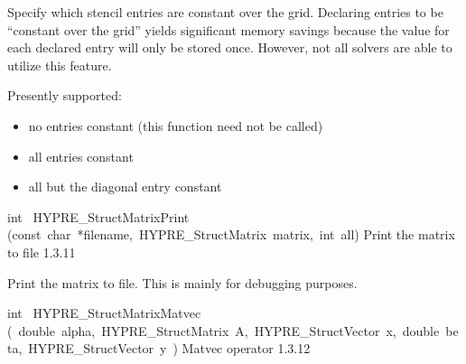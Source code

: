 \documentclass{article}
\begin{document}
\begin{cxxentry}
\begin{cxxentry}
\begin{cxxfunction}
\begin{cxxdoc}
Specify which stencil entries are constant over the grid.  Declaring entries
to be ``constant over the grid'' yields significant memory savings because
the value for each declared entry will only be stored once.  However, not all
solvers are able to utilize this feature.

Presently supported:
\begin{itemize}
\item no entries constant (this function need not be called)
\item all entries constant
\item all but the diagonal entry constant
\end{itemize}
\end{cxxdoc}
\end{cxxfunction}
\begin{cxxfunction}
{int\ }
        {HYPRE\_StructMatrixPrint}
        {(const\ char\ *filename,\ HYPRE\_StructMatrix\ matrix,\ int\ all)}
        {
Print the matrix to file}
        {1.3.11}
\begin{cxxdoc}

Print the matrix to file.  This is mainly for debugging purposes.
\end{cxxdoc}
\end{cxxfunction}
\begin{cxxfunction}
{int\ }
        {HYPRE\_StructMatrixMatvec}
        {(\ double\ alpha,\ HYPRE\_StructMatrix\ A,\ HYPRE\_StructVector\ x,\ double\ beta,\ HYPRE\_StructVector\ y\ )}
        {
Matvec operator}
        {1.3.12}
\begin{cxxdoc}


\end{cxxdoc}
\end{cxxfunction}
\end{cxxentry}
\end{cxxentry}
\end{document}
